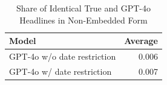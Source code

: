\begin{table}[!h]
\centering
\caption{Share of Identical True and GPT-4o Headlines in Non-Embedded Form}
\centering
\begin{tabular}[t]{lr}
\toprule
Model & Average\\
\midrule
GPT-4o w/o date restriction & 0.006\\
GPT-4o w/ date restriction & 0.007\\
\bottomrule
\end{tabular}
\end{table}

